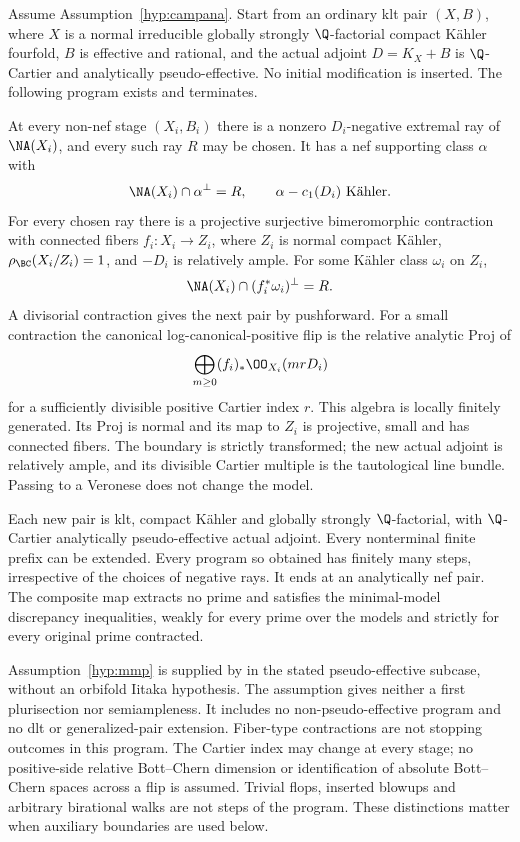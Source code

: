 \begin{assumption}
\label{hyp:mmp}
Assume Assumption~\ref{hyp:campana}. Start from an ordinary klt pair
\((X,B)\), where \(X\) is a normal irreducible globally strongly
\(\Q\)-factorial compact K\"ahler fourfold, \(B\) is effective
and rational, and the actual adjoint \(D=K_X+B\) is
\(\Q\)-Cartier and analytically pseudo-effective. No initial
modification is inserted. The following program exists and
terminates.

At every non-nef stage \((X_i,B_i)\) there is a nonzero
\(D_i\)-negative extremal ray of \(\NA(X_i)\), and every such
ray \(R\) may be chosen. It has a nef supporting class \(\alpha\)
with
\[
 \NA(X_i)\cap\alpha^\perp=R,
 \qquad \alpha-c_1(D_i)\text{ K\"ahler}.
\]
For every chosen ray there is a projective surjective bimeromorphic
contraction with connected fibers
\(f_i:X_i\to Z_i\), where \(Z_i\) is normal compact K\"ahler,
\(\rho_{\BC}(X_i/Z_i)=1\), and \(-D_i\) is relatively ample.
For some K\"ahler class \(\omega_i\) on \(Z_i\),
\[
 \NA(X_i)\cap(f_i^*\omega_i)^\perp=R.
\]
A divisorial contraction gives the next pair by pushforward. For a
small contraction the canonical log-canonical-positive flip is the
relative analytic Proj of
\[
 \bigoplus_{m\ge0}(f_i)_*\OO_{X_i}(mrD_i)
\]
for a sufficiently divisible positive Cartier index \(r\). This
algebra is locally finitely generated. Its Proj is normal and its
map to \(Z_i\) is projective, small and has connected fibers. The
boundary is strictly transformed; the new actual adjoint is
relatively ample, and its divisible Cartier multiple is the
tautological line bundle. Passing to a Veronese does not change the
model.

Each new pair is klt, compact K\"ahler and globally strongly
\(\Q\)-factorial, with \(\Q\)-Cartier analytically
pseudo-effective actual adjoint. Every nonterminal finite prefix
can be extended. Every program so obtained has finitely many steps,
irrespective of the choices of negative rays. It ends at an
analytically nef pair. The composite map extracts no prime and
satisfies the minimal-model discrepancy inequalities, weakly for
every prime over the models and strictly for every original prime
contracted.
\end{assumption}

Assumption~\ref{hyp:mmp} is supplied by
\cite[Theorem~6.20; Proposition~3.4 and its proof]{GrantMMP}
in the stated pseudo-effective subcase, without an orbifold Iitaka
hypothesis. The assumption gives neither a first plurisection
nor semiampleness. It includes no non-pseudo-effective program and
no dlt or generalized-pair extension. Fiber-type contractions are
not stopping outcomes in this program. The Cartier index may change
at every stage; no positive-side relative Bott--Chern dimension or
identification of absolute Bott--Chern spaces across a flip is
assumed. Trivial flops, inserted blowups and arbitrary birational
walks are not steps of the program. These distinctions matter when
auxiliary boundaries are used below.

